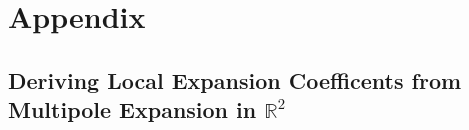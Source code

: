 \chapter{Appendix}

\section{Deriving Local Expansion Coefficents from Multipole Expansion in $\mathbb{R}^2$}\label{app:a_1_fmm_algorithm}
